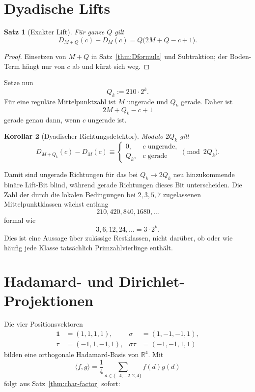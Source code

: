 \documentclass[11pt,a4paper]{article}
\newtheorem{satz}{Satz}[section]
\newtheorem{korollar}[satz]{Korollar}
\theoremstyle{definition}
\theoremstyle{remark}
\begin{document}
\section{Dyadische Lifts}

\begin{satz}[Exakter Lift]\label{thm:lift}
Für ganze $Q$ gilt
\[
\boxed{
D_{M+Q}(c)-D_M(c)=Q\bigl(2M+Q-c+1\bigr).
}
\]
\end{satz}

\begin{proof}
Einsetzen von $M+Q$ in Satz~\ref{thm:Dformula} und Subtraktion; der Boden-Term hängt nur von $c$ ab und kürzt sich weg.
\end{proof}

Setze nun
\[
Q_k:=210\cdot2^k.
\]
Für eine reguläre Mittelpunktzahl ist $M$ ungerade und $Q_k$ gerade. Daher ist
\[
2M+Q_k-c+1
\]
gerade genau dann, wenn $c$ ungerade ist.

\begin{korollar}[Dyadischer Richtungsdetektor]\label{cor:dyadic}
Modulo $2Q_k$ gilt
\[
\boxed{
D_{M+Q_k}(c)-D_M(c)\equiv
\begin{cases}
0,&c\text{ ungerade},\\
Q_k,&c\text{ gerade}
\end{cases}
\pmod{2Q_k}.}
\]
\end{korollar}

Damit sind ungerade Richtungen für das bei $Q_k\to2Q_k$ neu hinzukommende binäre Lift-Bit blind, während gerade Richtungen dieses Bit unterscheiden. Die Zahl der durch die lokalen Bedingungen bei $2,3,5,7$ zugelassenen Mittelpunktklassen wächst entlang
\[
210,420,840,1680,\ldots
\]
formal wie
\[
3,6,12,24,\ldots=3\cdot2^k.
\]
Dies ist eine Aussage über zulässige Restklassen, nicht darüber, ob oder wie häufig jede Klasse tatsächlich Primzahlvierlinge enthält.

\section{Hadamard- und Dirichlet-Projektionen}

Die vier Positionsvektoren
\[
\begin{aligned}
\mathbf 1&=(1,1,1,1), & \sigma&=(1,-1,-1,1),\\
\tau&=(-1,1,-1,1), & \sigma\tau&=(-1,-1,1,1)
\end{aligned}
\]
bilden eine orthogonale Hadamard-Basis von $\mathbb R^4$. Mit
\[
\langle f,g\rangle=\frac14\sum_{d\in\{-4,-2,2,4\}}f(d)g(d)
\]
folgt aus Satz~\ref{thm:char-factor} sofort:
\end{document}
